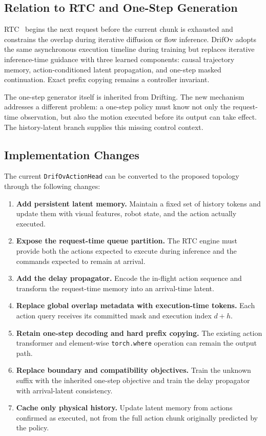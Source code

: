 \subsection{Relation to RTC and One-Step Generation}

RTC~\cite{black2025realtimechunking} begins the next request before the current
chunk is exhausted and constrains the overlap during iterative diffusion or
flow inference.  DrifOv adopts the same asynchronous execution timeline during
training but replaces iterative inference-time guidance with three learned
components: causal trajectory memory, action-conditioned latent propagation,
and one-step masked continuation.  Exact prefix copying remains a controller
invariant.

The one-step generator itself is inherited from Drifting.  The new mechanism
addresses a different problem: a one-step policy must know not only the
request-time observation, but also the motion executed before its output can
take effect.  The history-latent branch supplies this missing control context.

\subsection{Implementation Changes}
\label{sec:implementation_changes}

The current \texttt{DrifOvActionHead} can be converted to the proposed topology
through the following changes:
\begin{enumerate}
    \item \textbf{Add persistent latent memory.}
          Maintain a fixed set of history tokens and update them with visual
          features, robot state, and the action actually executed.
    \item \textbf{Expose the request-time queue partition.}
          The RTC engine must provide both the actions expected to execute
          during inference and the commands expected to remain at arrival.
    \item \textbf{Add the delay propagator.}
          Encode the in-flight action sequence and transform the request-time
          memory into an arrival-time latent.
    \item \textbf{Replace global overlap metadata with execution-time tokens.}
          Each action query receives its committed mask and execution index
          \(d+h\).
    \item \textbf{Retain one-step decoding and hard prefix copying.}
          The existing action transformer and element-wise
          \texttt{torch.where} operation can remain the output path.
    \item \textbf{Replace boundary and compatibility objectives.}
          Train the unknown suffix with the inherited one-step objective and
          train the delay propagator with arrival-latent consistency.
    \item \textbf{Cache only physical history.}
          Update latent memory from actions confirmed as executed, not from the
          full action chunk originally predicted by the policy.
\end{enumerate}

